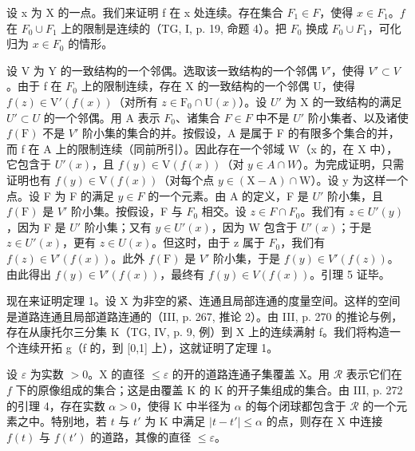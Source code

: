 设 x 为 X 的一点。我们来证明 f 在 x 处连续。存在集合 \(F_{1} \in F\)，使得 \(x \in F_{1}\)。\(f\) 在 \(F_{0} \cup F_{1}\) 上的限制是连续的（TG, I, p. 19, 命题 4）。把 \(F_{0}\) 换成 \(F_{0} \cup F_{1}\)，可化归为 \(x \in F_{0}\) 的情形。

设 V 为 Y 的一致结构的一个邻偶。选取该一致结构的一个邻偶 \(V'\)，使得 \(V' \subset V\)。由于 f 在 \(F_0\) 上的限制连续，存在 X 的一致结构的一个邻偶 U，使得 \(f(z) \in \mathrm{V}'(f(x))\)（对所有 \(z \in \mathrm{F}_0 \cap \mathrm{U}(x)\)）。设 \(U'\) 为 X 的一致结构的满足 \(U' \subset U\) 的一个邻偶。用 A 表示 \(F_0\)、诸集合 \(F \in F\) 中不是 \(U'\) 阶小集者、以及诸使 \(f(\mathrm{F})\) 不是 \(V'\) 阶小集的集合的并。按假设，A 是属于 F 的有限多个集合的并，而 f 在 A 上的限制连续（同前所引）。因此存在一个邻域 W（x 的，在 X 中），它包含于 \(U'(x)\)，且 \(f(y) \in \mathrm{V}(f(x))\)（对 \(y \in A \cap W\)）。为完成证明，只需证明也有 \(f(y) \in \mathrm{V}(f(x))\)（对每个点 \(y \in (\mathrm{X} - \mathrm{A}) \cap \mathrm{W}\)）。设 y 为这样一个点。设 F 为 F 的满足 \(y \in F\) 的一个元素。由 A 的定义，F 是 \(U'\) 阶小集，且 \(f(\mathrm{F})\) 是 \(V'\) 阶小集。按假设，F 与 \(F_0\) 相交。设 \(z \in F \cap F_0\)。我们有 \(z \in U'(y)\)，因为 F 是 \(U'\) 阶小集；又有 \(y \in U'(x)\)，因为 W 包含于 \(U'(x)\)；于是 \(z \in U'(x)\)，更有 \(z \in U(x)\)。但这时，由于 z 属于 \(F_0\)，我们有 \(f(z) \in V'(f(x))\)。此外 \(f(\mathrm{F})\) 是 \(V'\) 阶小集，于是 \(f(y) \in V'(f(z))\)。由此得出 \(f(y) \in V'(f(x))\)，最终有 \(f(y) \in V(f(x))\)。引理 5 证毕。

现在来证明定理 1。设 X 为非空的紧、连通且局部连通的度量空间。这样的空间是道路连通且局部道路连通的（III, p. 267, 推论 2）。由 III, p. 270 的推论与例，存在从康托尔三分集 K（TG, IV, p. 9, 例）到 X 上的连续满射 f。我们将构造一个连续开拓 g（f 的，到 {[}0,1{]} 上），这就证明了定理 1。

设 \(\varepsilon\) 为实数 \(>0\)。X 的直径 \(\leqslant \varepsilon\) 的开的道路连通子集覆盖 X。用 \(\mathcal{R}\) 表示它们在 \(f\) 下的原像组成的集合；这是由覆盖 K 的 K 的开子集组成的集合。由 III, p. 272 的引理 4，存在实数 \(\alpha > 0\)，使得 K 中半径为 \(\alpha\) 的每个闭球都包含于 \(\mathcal{R}\) 的一个元素之中。特别地，若 \(t\) 与 \(t'\) 为 K 中满足 \(|t - t'| \leqslant \alpha\) 的点，则存在 X 中连接 \(f(t)\) 与 \(f(t')\) 的道路，其像的直径 \(\leqslant \varepsilon\)。

